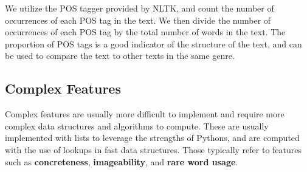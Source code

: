 \begin{description}
    We utilize the POS tagger provided by NLTK, and count the number of occurrences of each POS tag in the text. We then divide the number of occurrences of each POS tag by the total number of words in the text.
    The proportion of POS tags is a good indicator of the structure of the text, and can be used to compare the text to other texts in the same genre.
    

\end{description}

\subsection{Complex Features}
Complex features are usually more difficult to implement and require more complex data structures and algorithms to compute. These are usually implemented with lists to leverage the strengths of Pythons, and are computed with the use of lookups in fast data structures. Those typically refer to features such as \textbf{concreteness}, \textbf{imageability}, and \textbf{rare word usage}. 

